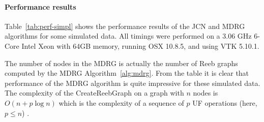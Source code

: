\documentclass[twocolumn]{article}
\begin{document}
\begin{table}[h!]
 \begin{centering}
 \caption{Performance results for Simplification}
\label{tab:perf-simpl}
\end{centering}
\end{table}
\paragraph{Performance results} Table~\ref{tab:perf-simpl} shows the performance
results of the JCN and MDRG algorithms for some simulated
data. All timings were performed on a 3.06 GHz 6-Core Intel Xeon with 64GB memory, running
OSX 10.8.5, and using VTK 5.10.1. 

The number of nodes in the MDRG is actually the number of Reeb graphs
computed by the MDRG Algorithm~\ref{alg:mdrg}. From the table it is clear that
performance of the MDRG algorithm is quite impressive for these
simulated data. The complexity of the CreateReebGraph on a graph with $n$ nodes is $O(n+p\log n)$ 
which is the complexity of a sequence of $p$ UF operations (here,
$p\leq n$) \cite{1975-tarjan}. 
 
\end{document}
